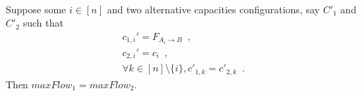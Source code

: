 \begin{theorem} \ \\
   \label{trustsave}
   Suppose some $i \in [n]$ and two alternative capacities configurations, say $C'_1$ and $C'_2$ such that
   \begin{equation*}
   \begin{gathered}
      c_{1,i}' = F_{A_i \rightarrow B} \enspace, \\
      c_{2,i}' = c_i \enspace, \\
      \forall k \in [n] \setminus \{i\}, c'_{1,k} = c'_{2,k} \enspace.
   \end{gathered}
   \end{equation*}
   Then $maxFlow_1 = maxFlow_2$.
\end{theorem}
